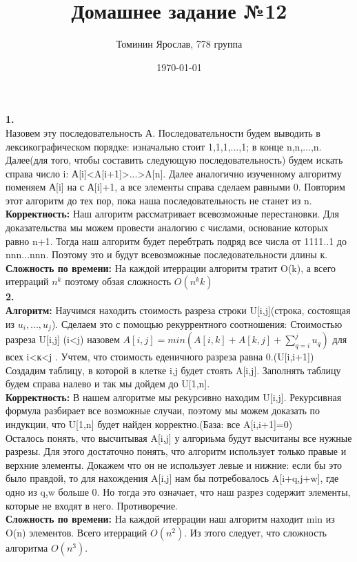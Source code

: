 \documentclass[a4paper,12pt]{article}
\author{Томинин Ярослав, 778 группа}
\title{Домашнее задание №12}
\date{\today}
\begin{document}
 

\maketitle
\newpage
\textbf{1.}\\
Назовем эту последовательность А. Последовательности будем выводить в лексикографическом порядке: изначально стоит 1,1,1,...,1; в конце n,n,...,n. Далее(для того, чтобы составить следующую последовательность) будем искать справа число i: А[i]<A[i+1]>...>A[n]. Далее аналогично изученному алгоритму поменяем А[i]  на с А[i]+1, а все элементы справа сделаем равными 0.  Повторим этот алгоритм до тех пор, пока наша последовательность не станет из n.\\
\textbf{Корректность:} Наш алгоритм рассматривает всевозможные перестановки. Для доказательства мы можем провести аналогию с числами, основание которых равно n+1. Тогда наш алгоритм будет перебтрать подряд все числа от 1111..1 до nnn...nnn. Поэтому это и будут всевозможные последовательности длины к.\\
\textbf{Сложность по времени:} На каждой итеррации алгоритм тратит O(k), а всего итерраций $n^k$ поэтому обзая сложность $O(n^{k}k)$\\
\textbf{2.}\\
\textbf{Алгоритм:} Научимся находить стоимость разреза строки U[i,j](строка, состоящая из $u_i,...,u_j$). Сделаем это с помощью рекуррентного соотношения: Стоимостью разреза U[i,j] (i<j) назовем $A[i,j]=min(A[i,k]+A[k,j]+\sum_{q=i}^j u_q)$ для всех i<к<j . Учтем, что стоимость еденичного разреза равна 0.(U[i,i+1]) Создадим таблицу, в которой в клетке i,j будет стоять A[i,j]. Заполнять таблицу будем справа налево и так мы дойдем до U[1,n]. 
\\
\textbf{Корректность:} В нашем алгоритме мы рекурсивно находим U[i,j]. Рекурсивная формула разбирает все возможные случаи, поэтому мы можем доказать по индукции, что U[1,n] будет найден корректно.(База: все A[i,i+1]=0)\\
Осталось понять, что высчитывая A[i,j] у алгориьма будут высчитаны все нужные разрезы. Для этого достаточно понять, что алгоритм использует только правые и верхние элементы. Докажем что он не использует левые и нижние: если бы это было правдой, то для нахождения A[i,j] нам бы потребовалось A[i+q,j+w], где одно из q,w больше 0. Но тогда это означает, что наш разрез содержит элементы, которые не входят в него. Противоречие.\\
\textbf{Сложность по времени:} На каждой итеррации наш алгоритм находит min из O(n) элементов. Всего итерраций $O(n^2)$. Из этого следует, что сложность алгоритма $O(n^3)$.
\end{document}
